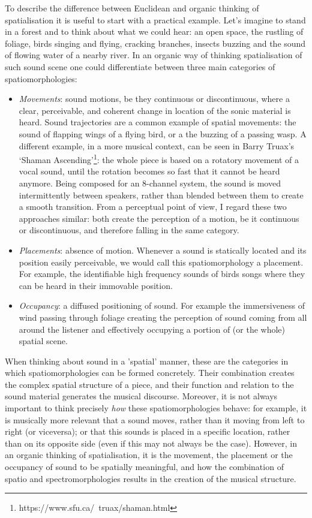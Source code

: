 \documentclass{article}
\begin{document}
To describe the difference between Euclidean and organic thinking of spatialisation it is useful to start with a practical example. Let's imagine to stand in a forest and to think about what we could hear: an open space, the rustling of foliage, birds singing and flying, cracking branches, insects buzzing and the sound of flowing water of a nearby river. In an organic way of thinking spatialisation of such sound scene one could differentiate between three main categories of spatiomorphologies: 
\begin{itemize}
    \item \textit{Movements}: sound motions, be they continuous or discontinuous, where a clear, perceivable, and coherent change in location of the sonic material is heard. Sound trajectories are a common example of spatial movements: the sound of flapping wings of a flying bird, or a the buzzing of a passing wasp. A different example, in a more musical context, can be seen in Barry Truax’s ‘Shaman Ascending’\footnote{https://www.sfu.ca/~truax/shaman.html}: the whole piece is based on a rotatory movement of a vocal sound, until the rotation becomes so fast that it cannot be heard anymore. Being composed for an 8-channel system, the sound is moved intermittently between speakers, rather than blended between them to create a smooth transition. From a perceptual point of view, I regard these two approaches similar: both create the perception of a motion, be it continuous or discontinuous, and therefore falling in the same category.
    \item \textit{Placements}: absence of motion. Whenever a sound is statically located and its position easily perceivable, we would call this spatiomorphology a placement. For example, the identifiable high frequency sounds of birds songs where they can be heard in their immovable position.
    \item \textit{Occupancy}: a diffused positioning of sound. For example the immersiveness of wind passing through foliage creating the perception of sound coming from all around the listener and effectively occupying a portion of (or the whole) spatial scene.
\end{itemize}

When thinking about sound in a 'spatial' manner, these are the categories in which spatiomorphologies can be formed concretely. Their combination creates the complex spatial structure of a piece, and their function and relation to the sound material generates the musical discourse. Moreover, it is not always important to think precisely \textit{how} these spatiomorphologies behave: for example, it is musically more relevant that a sound moves, rather than it moving from left to right (or viceversa); or that this sounds is placed in a specific location, rather than on its opposite side (even if this may not always be the case). However, in an organic thinking of spatialisation, it is the movement, the placement or the occupancy of sound to be spatially meaningful, and how the combination of spatio and spectromorphologies results in the creation of the musical structure. 
\end{document}
